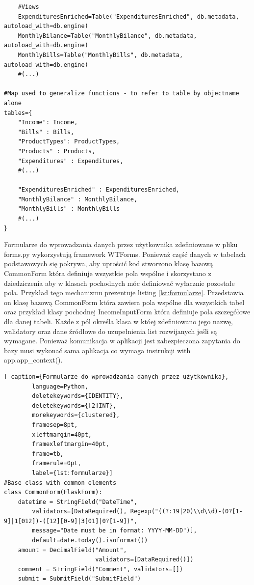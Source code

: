 \documentclass[a4paper,10pt, twoside]{report}
\begin{document}
\begin{large}
\begin{minipage}{\textwidth}
\begin{lstlisting}
    #Views
    ExpendituresEnriched=Table("ExpendituresEnriched", db.metadata, autoload_with=db.engine)
    MonthlyBilance=Table("MonthlyBilance", db.metadata, autoload_with=db.engine)
    MonthlyBills=Table("MonthlyBills", db.metadata, autoload_with=db.engine)
    #(...)

#Map used to generalize functions - to refer to table by objectname alone
tables={
    "Income": Income,
    "Bills" : Bills,
    "ProductTypes": ProductTypes,
    "Products" : Products,
    "Expenditures" : Expenditures,
    #(...)

    "ExpendituresEnriched" : ExpendituresEnriched,
    "MonthlyBilance" : MonthlyBilance,
    "MonthlyBills" : MonthlyBills
    #(...)
}\end{lstlisting}
\end{minipage}

{Formularze do wprowadzania danych przez użytkownika zdefiniowane w pliku 
forms.py wykorzystują framework WTForms. Ponieważ część danych w tabelach 
podstawowych się pokrywa, aby uprościć kod stworzono klasę bazową CommonForm 
która definiuje wszystkie pola wspólne i skorzystano z dziedziczenia aby w 
klasach pochodnych móc definiować wyłacznie pozostałe pola. Przykład tego 
mechanizmu prezentuje listing \ref*{lst:formularze}. Przedstawia on klasę bazową
 CommonForm która zawiera pola wspólne dla wszystkich tabel oraz przykład klasy 
pochodnej IncomeInputForm która definiuje pola szczegółowe dla danej tabeli. 
Każde z pól określa klasa w któej zdefiniowano jego nazwę, walidatory oraz dane 
źródłowe do uzupełnienia list rozwijanych jeśli są wymagane. Ponieważ 
komunikacja w aplikacji jest zabezpieczona zapytania do bazy musi wykonać sama 
aplikacja co wymaga instrukcji with app.app\_context().}

\begin{minipage}{\textwidth}
    \begin{lstlisting}[ caption={Formularze do wprowadzania danych przez użytkownika},
        language=Python,
        deletekeywords={IDENTITY},
        deletekeywords={[2]INT},
        morekeywords={clustered},
        framesep=8pt,
        xleftmargin=40pt,
        framexleftmargin=40pt,
        frame=tb,
        framerule=0pt,
        label={lst:formularze}]
#Base class with common elements
class CommonForm(FlaskForm):
    datetime = StringField("DateTime", 
        validators=[DataRequired(), Regexp("((?:19|20)\\d\\d)-(0?[1-9]|1[012])-([12][0-9]|3[01]|0?[1-9])", 
        message="Date must be in format: YYYY-MM-DD")],
        default=date.today().isoformat())
    amount = DecimalField("Amount", 
                          validators=[DataRequired()])
    comment = StringField("Comment", validators=[])
    submit = SubmitField("SubmitField")


\end{lstlisting}
\end{minipage}
\end{large}
\end{document}
